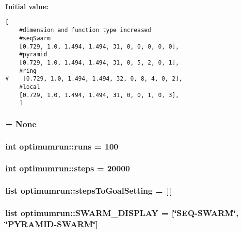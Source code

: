 \textbf{Initial value:}

\begin{Code}\begin{verbatim}[
    #dimension and function type increased
    #seqSwarm
    [0.729, 1.0, 1.494, 1.494, 31, 0, 0, 0, 0, 0],
    #pyramid
    [0.729, 1.0, 1.494, 1.494, 31, 0, 5, 2, 0, 1],
    #ring
#    [0.729, 1.0, 1.494, 1.494, 32, 0, 8, 4, 0, 2],
    #local
    [0.729, 1.0, 1.494, 1.494, 31, 0, 0, 1, 0, 3],
    ]
\end{verbatim}
\end{Code}
\hypertarget{namespaceoptimumrun_97ddf98bd590e9ee1f8d5c2bfd33fe4e}{
\subsubsection{ = None}}
\label{namespaceoptimumrun_97ddf98bd590e9ee1f8d5c2bfd33fe4e}


\hypertarget{namespaceoptimumrun_18f95b91b82a861b322903e5cab16568}{
\subsubsection{\setlength{\rightskip}{0pt plus 5cm}int {\bf optimumrun::runs} = 100}}
\label{namespaceoptimumrun_18f95b91b82a861b322903e5cab16568}


\hypertarget{namespaceoptimumrun_588035a0e4ea1ea88a4f0bc5608c6451}{
\subsubsection{\setlength{\rightskip}{0pt plus 5cm}int {\bf optimumrun::steps} = 20000}}
\label{namespaceoptimumrun_588035a0e4ea1ea88a4f0bc5608c6451}


\hypertarget{namespaceoptimumrun_7733ed14333e18fe7dd5485459c90254}{
\subsubsection{\setlength{\rightskip}{0pt plus 5cm}list {\bf optimumrun::stepsToGoalSetting} = \mbox{[}$\,$\mbox{]}}}
\label{namespaceoptimumrun_7733ed14333e18fe7dd5485459c90254}


\hypertarget{namespaceoptimumrun_2e8f730925a891b15ce89986fec3b5e5}{
\subsubsection{\setlength{\rightskip}{0pt plus 5cm}list {\bf optimumrun::SWARM\_\-DISPLAY} = \mbox{[}\char`\"{}SEQ-SWARM\char`\"{}, \char`\"{}PYRAMID-SWARM\char`\"{}\mbox{]}}}
\label{namespaceoptimumrun_2e8f730925a891b15ce89986fec3b5e5}


